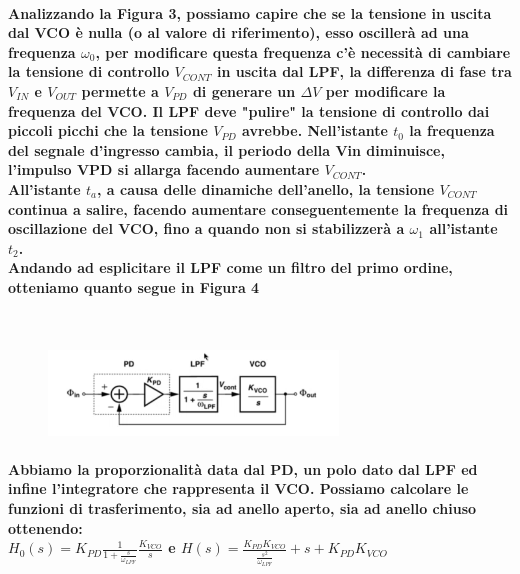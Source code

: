 \documentclass{article}
\begin{document}
\paragraph{Analizzando la Figura 3, possiamo capire che se la tensione in uscita dal VCO è nulla (o al valore di riferimento), esso oscillerà ad una frequenza $\omega _{0}$, per modificare questa frequenza c'è necessità di cambiare la tensione di controllo $V_{CONT}$ in uscita dal LPF, la differenza di fase tra $V_{IN}$ e $V_{OUT}$ permette a $V_{PD}$ di generare un $\Delta V$ per modificare la frequenza del VCO. Il LPF deve "pulire" la tensione di controllo dai piccoli picchi che la tensione $V_{PD}$ avrebbe. 
Nell'istante $t_{0}$ la frequenza del segnale d'ingresso cambia, il periodo della Vin diminuisce, l'impulso VPD si allarga facendo aumentare $V_{CONT}$.
\\All'istante $t_{a}$, a causa delle dinamiche dell'anello, la tensione $V_{CONT}$ continua a salire, facendo aumentare conseguentemente la frequenza di oscillazione del VCO, fino a quando non si stabilizzerà a $\omega _{1}$ all'istante $t_{2}$.\\Andando ad esplicitare il LPF come un filtro del primo ordine, otteniamo quanto segue in Figura 4}
~\begin{figure}[!h]%
\includegraphics[scale=1.5]{Esplicitato.png} 
\caption{}
\label{fig:foo}
\end{figure}
\paragraph{Abbiamo la proporzionalità data dal PD, un polo dato dal LPF ed infine l'integratore che rappresenta il VCO. Possiamo calcolare le funzioni di trasferimento, sia ad anello aperto, sia ad anello chiuso ottenendo:\\$H_{0}(s)=K_{PD}\frac{1}{1+\frac{s}{\omega _{LPF}}}\frac{K_{VCO}}{s}$   e   $H(s)=\frac{K_{PD}K_{VCO}}{\frac{s^{2}}{\omega_{LPF}}}+s+K_{PD}K_{VCO}$}
\end{document}
